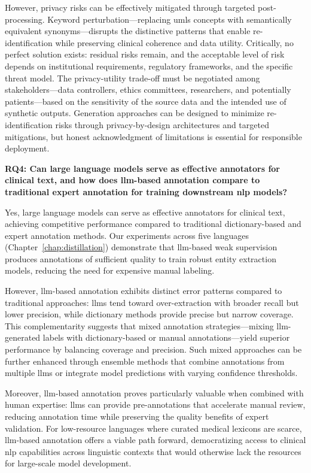 However, privacy risks can be effectively mitigated through targeted post-processing.
Keyword perturbation—replacing \gls{umls} concepts with semantically equivalent synonyms—disrupts the distinctive patterns that enable re-identification while preserving clinical coherence and data utility.
Critically, no perfect solution exists: residual risks remain, and the acceptable level of risk depends on institutional requirements, regulatory frameworks, and the specific threat model.
The privacy-utility trade-off must be negotiated among stakeholders—data controllers, ethics committees, researchers, and potentially patients—based on the sensitivity of the source data and the intended use of synthetic outputs.
Generation approaches can be designed to minimize re-identification risks through privacy-by-design architectures and targeted mitigations, but honest acknowledgment of limitations is essential for responsible deployment.

\textbf{RQ4: Can large language models serve as effective annotators for clinical text, and how does \gls{llm}-based annotation compare to traditional expert annotation for training downstream \gls{nlp} models?}

Yes, large language models can serve as effective annotators for clinical text, achieving competitive performance compared to traditional dictionary-based and expert annotation methods.
Our experiments across five languages (Chapter~\ref{chap:distillation}) demonstrate that \gls{llm}-based weak supervision produces annotations of sufficient quality to train robust entity extraction models, reducing the need for expensive manual labeling.

However, \gls{llm}-based annotation exhibits distinct error patterns compared to traditional approaches: \glspl{llm} tend toward over-extraction with broader recall but lower precision, while dictionary methods provide precise but narrow coverage.
This complementarity suggests that mixed annotation strategies—mixing \gls{llm}-generated labels with dictionary-based or manual annotations—yield superior performance by balancing coverage and precision.
Such mixed approaches can be further enhanced through ensemble methods that combine annotations from multiple \glspl{llm} or integrate model predictions with varying confidence thresholds.

Moreover, \gls{llm}-based annotation proves particularly valuable when combined with human expertise: \glspl{llm} can provide pre-annotations that accelerate manual review, reducing annotation time while preserving the quality benefits of expert validation.
For low-resource languages where curated medical lexicons are scarce, \gls{llm}-based annotation offers a viable path forward, democratizing access to clinical \gls{nlp} capabilities across linguistic contexts that would otherwise lack the resources for large-scale model development.

